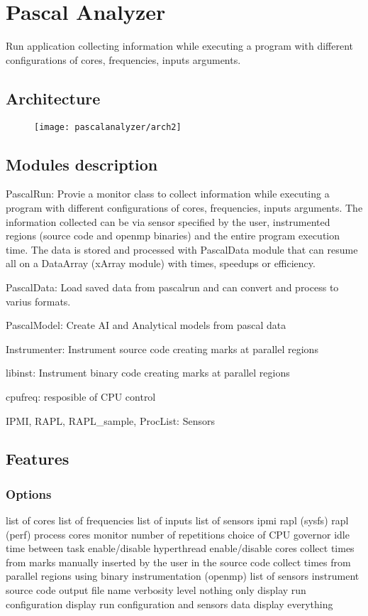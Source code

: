 \section{Pascal Analyzer}

Run application collecting information while executing a program with
different configurations of cores, frequencies, inputs arguments.

\subsection{Architecture}
\begin{figure}
	\texttt{[image: pascalanalyzer/arch2]}
\end{figure}
\subsection{Modules description}
PascalRun: Provie a monitor class to collect information while executing  a program 
with different configurations of cores, frequencies, inputs arguments. The information collected can be via sensor specified by the user,  instrumented regions (source code and openmp binaries) and the entire  program execution time. The data is stored and processed with PascalData  module that can resume all on a DataArray (xArray module) with times, speedups or efficiency.

PascalData: Load saved data from pascalrun and can convert and process to varius formats.

PascalModel: Create AI and Analytical models from pascal data

Instrumenter: Instrument source code creating marks at parallel regions

libinst: Instrument binary code creating marks at parallel regions

cpufreq: resposible of CPU control

IPMI, RAPL, RAPL\_sample, ProcList: Sensors

\subsection{Features}

\subsubsection{Options}
\begin{outline}
	\1 list of cores
	\1 list of frequencies
	\1 list of inputs
	\1 list of sensors
		\2 ipmi
		\2 rapl (sysfs)
		\2 rapl (perf)
		\2 process cores monitor
	\1 number of repetitions
	\1 choice of CPU governor
	\1 idle time between task
	\1 enable/disable hyperthread
	\1 enable/disable cores
	\1 collect times from marks manually inserted by the user in the source code
	\1 collect times from parallel regions using binary instrumentation (openmp)
	\1 list of sensors
	\1 instrument source code
	\1 output file name
	\1 verbosity level
		 nothing
		 only display run configuration
		 display run configuration and sensors data
		 display everything
\end{outline}


